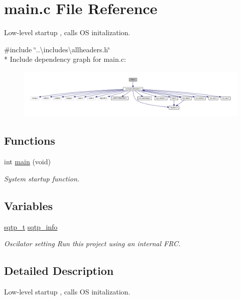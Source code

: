 \hypertarget{a00048}{\section{main.\+c File Reference}
\label{a00048}
}


Low-\/level startup , calls O\+S initalization.  


{\ttfamily \#include \char`\"{}..\textbackslash{}includes\textbackslash{}allheaders.\+h\char`\"{}}\\*
Include dependency graph for main.\+c\+:\nopagebreak
\begin{figure}[H]
\begin{center}
\leavevmode
\includegraphics[width=350pt]{d9/dce/a00944}
\end{center}
\end{figure}
\subsection*{Functions}
\begin{DoxyCompactItemize}
\item 
int \hyperlink{a00048_a840291bc02cba5474a4cb46a9b9566fe}{main} (void)
\begin{DoxyCompactList}\small\item\em System startup function. \end{DoxyCompactList}\end{DoxyCompactItemize}
\subsection*{Variables}
\begin{DoxyCompactItemize}
\item 
\hyperlink{a00033_d3/d95/a00779}{sqtp\+\_\+t} \hyperlink{a00048_a4e1e8b365cce7a6d497671681eb5823c}{sqtp\+\_\+info}
\begin{DoxyCompactList}\small\item\em Oscilator setting Run this project using an internal F\+R\+C. \end{DoxyCompactList}\end{DoxyCompactItemize}


\subsection{Detailed Description}
Low-\/level startup , calls O\+S initalization. 



